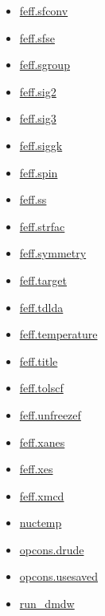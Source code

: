 \documentclass[11pt]{article}
\begin{document}
\begin{itemize}
\item \hyperref[kw:feff-sfconv]{feff.sfconv}
\item \hyperref[kw:feff-sfse]{feff.sfse}
\item \hyperref[kw:feff-sgroup]{feff.sgroup}
\item \hyperref[kw:feff-sig2]{feff.sig2}
\item \hyperref[kw:feff-sig3]{feff.sig3}
\item \hyperref[kw:feff-siggk]{feff.siggk}
\item \hyperref[kw:feff-spin]{feff.spin}
\item \hyperref[kw:feff-ss]{feff.ss}
\item \hyperref[kw:feff-strfac]{feff.strfac}
\item \hyperref[kw:feff-symmetry]{feff.symmetry}
\item \hyperref[kw:feff-target]{feff.target}
\item \hyperref[kw:feff-tdlda]{feff.tdlda}
\item \hyperref[kw:feff-temperature]{feff.temperature}
\item \hyperref[kw:feff-title]{feff.title}
\item \hyperref[kw:feff-tolscf]{feff.tolscf}
\item \hyperref[kw:feff-unfreezef]{feff.unfreezef}
\item \hyperref[kw:feff-xanes]{feff.xanes}
\item \hyperref[kw:feff-xes]{feff.xes}
\item \hyperref[kw:feff-xmcd]{feff.xmcd}
\item \hyperref[kw:nuctemp]{nuctemp}
\item \hyperref[kw:opcons-drude]{opcons.drude}
\item \hyperref[kw:opcons-usesaved]{opcons.usesaved}
\item \hyperref[kw:run-dmdw]{run\_dmdw}
\end{itemize}
\end{document}
